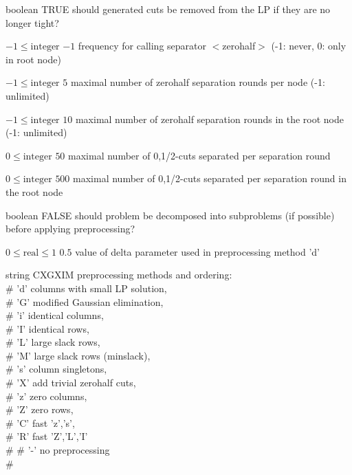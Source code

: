%
{boolean}%
{TRUE}%
{should generated cuts be removed from the LP if they are no longer tight?}%
{}

%
{$-1\leq\textrm{integer}$}%
{$-1$}%
{frequency for calling separator $<$zerohalf$>$ (-1: never, 0: only in root node)}%
{}

%
{$-1\leq\textrm{integer}$}%
{$5$}%
{maximal number of zerohalf separation rounds per node (-1: unlimited)}%
{}

%
{$-1\leq\textrm{integer}$}%
{$10$}%
{maximal number of zerohalf separation rounds in the root node (-1: unlimited)}%
{}

%
{$0\leq\textrm{integer}$}%
{$50$}%
{maximal number of {0,1/2}-cuts separated per separation round}%
{}

%
{$0\leq\textrm{integer}$}%
{$500$}%
{maximal number of {0,1/2}-cuts separated per separation round in the root node}%
{}

%
{boolean}%
{FALSE}%
{should problem be decomposed into subproblems (if possible) before applying preprocessing?}%
{}

%
{$0\leq\textrm{real}\leq1$}%
{$0.5$}%
{value of delta parameter used in preprocessing method 'd'}%
{}

%
{string}%
{CXGXIM}%
{preprocessing methods and ordering:\\   \#                      'd' columns with small LP solution,\\   \#                      'G' modified Gaussian elimination,\\   \#                      'i' identical columns,\\   \#                      'I' identical rows,\\   \#                      'L' large slack rows,\\   \#                      'M' large slack rows (minslack),\\   \#                      's' column singletons,\\   \#                      'X' add trivial zerohalf cuts,\\   \#                      'z' zero columns,\\   \#                      'Z' zero rows,\\   \#                      'C' fast {'z','s'},\\   \#                      'R' fast {'Z','L','I'}\\   \#
   \#                      '-' no preprocessing\\   \#}%
{}

